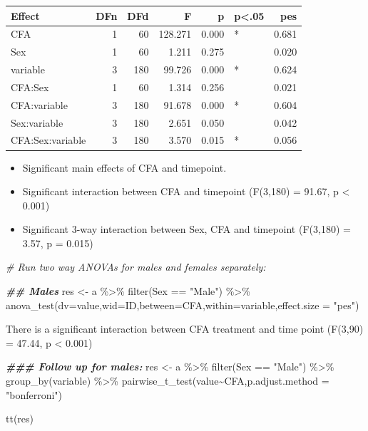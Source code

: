 \documentclass[
]{book}
\newenvironment{Shaded}{\begin{snugshade}}{\end{snugshade}}
\newcommand{\AttributeTok}[1]{\textcolor[rgb]{0.77,0.63,0.00}{#1}}
\newcommand{\CommentTok}[1]{\textcolor[rgb]{0.56,0.35,0.01}{\textit{#1}}}
\newcommand{\DocumentationTok}[1]{\textcolor[rgb]{0.56,0.35,0.01}{\textbf{\textit{#1}}}}
\newcommand{\FunctionTok}[1]{\textcolor[rgb]{0.00,0.00,0.00}{#1}}
\newcommand{\NormalTok}[1]{#1}
\newcommand{\OtherTok}[1]{\textcolor[rgb]{0.56,0.35,0.01}{#1}}
\newcommand{\SpecialCharTok}[1]{\textcolor[rgb]{0.00,0.00,0.00}{#1}}
\newcommand{\StringTok}[1]{\textcolor[rgb]{0.31,0.60,0.02}{#1}}
\begin{document}
\begin{tabular}{l|r|r|r|r|l|r}
\hline
Effect & DFn & DFd & F & p & p<.05 & pes\\
\hline
CFA & 1 & 60 & 128.271 & 0.000 & * & 0.681\\
\hline
Sex & 1 & 60 & 1.211 & 0.275 &  & 0.020\\
\hline
variable & 3 & 180 & 99.726 & 0.000 & * & 0.624\\
\hline
CFA:Sex & 1 & 60 & 1.314 & 0.256 &  & 0.021\\
\hline
CFA:variable & 3 & 180 & 91.678 & 0.000 & * & 0.604\\
\hline
Sex:variable & 3 & 180 & 2.651 & 0.050 &  & 0.042\\
\hline
CFA:Sex:variable & 3 & 180 & 3.570 & 0.015 & * & 0.056\\
\hline
\end{tabular}

\begin{itemize}
\item
  Significant main effects of CFA and timepoint.
\item
  Significant interaction between CFA and timepoint (F(3,180) = 91.67, p \textless{} 0.001)
\item
  Significant 3-way interaction between Sex, CFA and timepoint (F(3,180) = 3.57, p = 0.015)
\end{itemize}

\begin{Shaded}
\begin{Highlighting}[]
\CommentTok{\# Run two way ANOVAs for males and females separately: }

\DocumentationTok{\#\# Males}
\NormalTok{res }\OtherTok{\textless{}{-}}\NormalTok{ a }\SpecialCharTok{\%\textgreater{}\%}
  \FunctionTok{filter}\NormalTok{(Sex }\SpecialCharTok{==} \StringTok{"Male"}\NormalTok{) }\SpecialCharTok{\%\textgreater{}\%}
  \FunctionTok{anova\_test}\NormalTok{(}\AttributeTok{dv=}\NormalTok{value,}\AttributeTok{wid=}\NormalTok{ID,}\AttributeTok{between=}\NormalTok{CFA,}\AttributeTok{within=}\NormalTok{variable,}\AttributeTok{effect.size =} \StringTok{"pes"}\NormalTok{)}
\end{Highlighting}
\end{Shaded}

There is a significant interaction between CFA treatment and time point (F(3,90) = 47.44, p \textless{} 0.001)

\begin{Shaded}
\begin{Highlighting}[]
\DocumentationTok{\#\#\# Follow up for males: }
\NormalTok{res }\OtherTok{\textless{}{-}}\NormalTok{ a }\SpecialCharTok{\%\textgreater{}\%} 
  \FunctionTok{filter}\NormalTok{(Sex }\SpecialCharTok{==} \StringTok{"Male"}\NormalTok{) }\SpecialCharTok{\%\textgreater{}\%}
  \FunctionTok{group\_by}\NormalTok{(variable) }\SpecialCharTok{\%\textgreater{}\%}
  \FunctionTok{pairwise\_t\_test}\NormalTok{(value}\SpecialCharTok{\textasciitilde{}}\NormalTok{CFA,}\AttributeTok{p.adjust.method =} \StringTok{"bonferroni"}\NormalTok{)}

\FunctionTok{tt}\NormalTok{(res)}
\end{Highlighting}
\end{Shaded}
\end{document}
